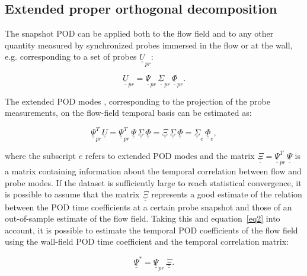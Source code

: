 \subsection{\label{sec:12}Extended proper orthogonal decomposition}

The snapshot POD can be applied both to the flow field and to any other quantity measured by synchronized probes immersed in the flow or at the wall, e.g. corresponding to a set of probes  $\underline{\underline{U}}_{pr}$:

\begin{equation}
   \underline{\underline{U}}_{pr} = \underline{\underline{\Psi}}_{pr}\,\underline{\underline{\Sigma}}_{pr}\,\underline{\underline{\Phi}}_{pr}.
\end{equation}

The extended POD modes \citep{boree2003extended}, corresponding to the projection of the probe measurements, on the flow-field temporal basis can be estimated as:

\begin{equation}
   \underline{\underline{\Psi}}_{pr}^T\underline{\underline{U}} =  \underline{\underline{\Psi}}_{pr}^T\,\underline{\underline{\Psi}}\,\underline{\underline{\Sigma}}\,\underline{\underline{\Phi}} = \underline{\underline{\Xi}}\,\underline{\underline{\Sigma}}\,\underline{\underline{\Phi}} = \underline{\underline{\Sigma}}_e\,\underline{\underline{\Phi}}_e,
   \label{eq2}
\end{equation}{}

\noindent where the subscript $e$ refers to extended POD modes and the matrix $\underline{\underline{\Xi}} = \underline{\underline{\Psi}}_{pr}^T\,\underline{\underline{\Psi}}$ is a matrix containing information about the temporal correlation between flow and probe modes.
If the dataset is sufficiently large to reach statistical convergence, it is possible to assume that the matrix $\underline{\underline{\Xi}}$ represents a good estimate of the relation between the POD time coefficients at a certain probe snapshot and those of an out-of-sample estimate of the flow field.
Taking this and equation~\ref{eq2} into account, it is possible to estimate the temporal POD coefficients of the flow field using the wall-field POD time coefficient and the temporal correlation matrix:

\begin{equation}
   \underline{\underline{\Psi}}^* = \underline{\underline{\Psi}}_{pr}\,\underline{\underline{\Xi}}.
\end{equation}

